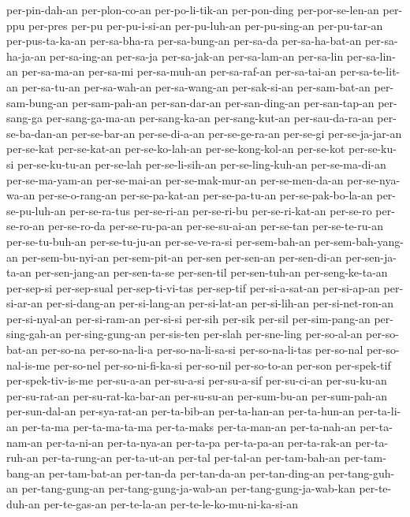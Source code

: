 {per-pin-dah-an per-plon-co-an per-po-li-tik-an per-pon-ding
per-por-se-len-an per-ppu per-pres per-pu per-pu-i-si-an per-pu-luh-an
per-pu-sing-an per-pu-tar-an per-pus-ta-ka-an per-sa-bha-ra per-sa-bung-an
per-sa-da per-sa-ha-bat-an per-sa-ha-ja-an per-sa-ing-an per-sa-ja
per-sa-jak-an per-sa-lam-an per-sa-lin per-sa-lin-an per-sa-ma-an
per-sa-mi per-sa-muh-an per-sa-raf-an per-sa-tai-an per-sa-te-lit-an
per-sa-tu-an per-sa-wah-an per-sa-wang-an per-sak-si-an per-sam-bat-an
per-sam-bung-an per-sam-pah-an per-san-dar-an per-san-ding-an
per-san-tap-an per-sang-ga per-sang-ga-ma-an per-sang-ka-an
per-sang-kut-an per-sau-da-ra-an per-se-ba-dan-an per-se-bar-an
per-se-di-a-an per-se-ge-ra-an per-se-gi per-se-ja-jar-an per-se-kat
per-se-kat-an per-se-ko-lah-an per-se-kong-kol-an per-se-kot per-se-ku-si
per-se-ku-tu-an per-se-lah per-se-li-sih-an per-se-ling-kuh-an
per-se-ma-di-an per-se-ma-yam-an per-se-mai-an per-se-mak-mur-an
per-se-men-da-an per-se-nya-wa-an per-se-o-rang-an per-se-pa-kat-an
per-se-pa-tu-an per-se-pak-bo-la-an per-se-pu-luh-an per-se-ra-tus
per-se-ri-an per-se-ri-bu per-se-ri-kat-an per-se-ro per-se-ro-an
per-se-ro-da per-se-ru-pa-an per-se-su-ai-an per-se-tan per-se-te-ru-an
per-se-tu-buh-an per-se-tu-ju-an per-se-ve-ra-si per-sem-bah-an
per-sem-bah-yang-an per-sem-bu-nyi-an per-sem-pit-an per-sen per-sen-an
per-sen-di-an per-sen-ja-ta-an per-sen-jang-an per-sen-ta-se per-sen-til
per-sen-tuh-an per-seng-ke-ta-an per-sep-si per-sep-sual per-sep-ti-vi-tas
per-sep-tif per-si-a-sat-an per-si-ap-an per-si-ar-an per-si-dang-an
per-si-lang-an per-si-lat-an per-si-lih-an per-si-net-ron-an
per-si-nyal-an per-si-ram-an per-si-si per-sih per-sik per-sil
per-sim-pang-an per-sing-gah-an per-sing-gung-an per-sis-ten per-slah
per-sne-ling per-so-al-an per-so-bat-an per-so-na per-so-na-li-a
per-so-na-li-sa-si per-so-na-li-tas per-so-nal per-so-nal-is-me per-so-nel
per-so-ni-fi-ka-si per-so-nil per-so-to-an per-son per-spek-tif
per-spek-tiv-is-me per-su-a-an per-su-a-si per-su-a-sif per-su-ci-an
per-su-ku-an per-su-rat-an per-su-rat-ka-bar-an per-su-su-an per-sum-bu-an
per-sum-pah-an per-sun-dal-an per-sya-rat-an per-ta-bib-an per-ta-han-an
per-ta-hun-an per-ta-li-an per-ta-ma per-ta-ma-ta-ma per-ta-maks
per-ta-man-an per-ta-nah-an per-ta-nam-an per-ta-ni-an per-ta-nya-an
per-ta-pa per-ta-pa-an per-ta-rak-an per-ta-ruh-an per-ta-rung-an
per-ta-ut-an per-tal per-tal-an per-tam-bah-an per-tam-bang-an
per-tam-bat-an per-tan-da per-tan-da-an per-tan-ding-an per-tang-guh-an
per-tang-gung-an per-tang-gung-ja-wab-an per-tang-gung-ja-wab-kan
per-te-duh-an per-te-gas-an per-te-la-an per-te-le-ko-mu-ni-ka-si-an
}
